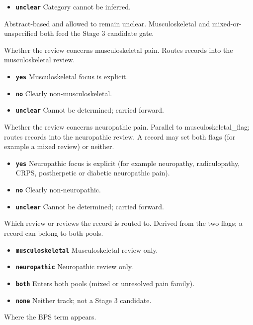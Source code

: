 \documentclass[11pt]{article}
\begin{document}
\begin{description}
\begin{itemize}[leftmargin=1.3em,itemsep=2pt,topsep=2pt]
  \item \textbf{\texttt{unclear}} Category cannot be inferred.
  \end{itemize}
{\small Abstract-based and allowed to remain unclear. Musculoskeletal and mixed-or-unspecified both feed the Stage 3 candidate gate.}
\item[\texttt{musculoskeletal\_flag}] Whether the review concerns musculoskeletal pain. Routes records into the musculoskeletal review.
  \begin{itemize}[leftmargin=1.3em,itemsep=2pt,topsep=2pt]
  \item \textbf{\texttt{yes}} Musculoskeletal focus is explicit.
  \item \textbf{\texttt{no}} Clearly non-musculoskeletal.
  \item \textbf{\texttt{unclear}} Cannot be determined; carried forward.
  \end{itemize}
\item[\texttt{neuropathic\_flag}] Whether the review concerns neuropathic pain. Parallel to musculoskeletal\_flag; routes records into the neuropathic review. A record may set both flags (for example a mixed review) or neither.
  \begin{itemize}[leftmargin=1.3em,itemsep=2pt,topsep=2pt]
  \item \textbf{\texttt{yes}} Neuropathic focus is explicit (for example neuropathy, radiculopathy, CRPS, postherpetic or diabetic neuropathic pain).
  \item \textbf{\texttt{no}} Clearly non-neuropathic.
  \item \textbf{\texttt{unclear}} Cannot be determined; carried forward.
  \end{itemize}
\item[\texttt{stage3\_track}] Which review or reviews the record is routed to. Derived from the two flags; a record can belong to both pools.
  \begin{itemize}[leftmargin=1.3em,itemsep=2pt,topsep=2pt]
  \item \textbf{\texttt{musculoskeletal}} Musculoskeletal review only.
  \item \textbf{\texttt{neuropathic}} Neuropathic review only.
  \item \textbf{\texttt{both}} Enters both pools (mixed or unresolved pain family).
  \item \textbf{\texttt{none}} Neither track; not a Stage 3 candidate.
  \end{itemize}
\item[\texttt{bps\_mention\_location}] Where the BPS term appears.

\end{description}
\end{document}
